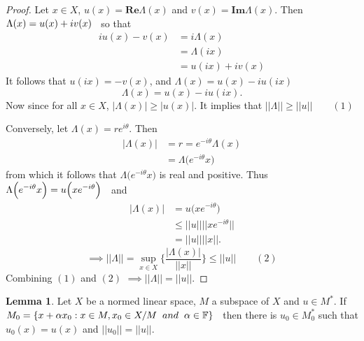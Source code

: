 \documentclass[11pt,a4paper]{article}
\theoremstyle{definition}
\newtheorem{lem}[thm]{Lemma}
\begin{document}
\begin{proof}
Let $x\in X$, $u(x)=\textbf{Re}\Lambda(x)$ and $v(x)=\textbf{Im}\Lambda(x)$. Then \hspace{0.2cm}$\Lambda(x)=u(x)+iv(x)\hspace{0.2cm}$ so that
\begin{align*}
iu(x)-v(x) &=i\Lambda(x)\\
           &=\Lambda(ix)\\
           &=u(ix)+iv(x)
\end{align*}
It follows that $u(ix)=-v(x)$, and $\Lambda(x)=u(x)-iu(ix)$ $$\Lambda(x)=u(x)-iu(ix).$$
Now since for all $x\in X$, $|\Lambda(x)|\geq |u(x)|$. It implies that $||\Lambda||\geq ||u||\qquad (1)$


Conversely, let $\Lambda(x)=re^{i\theta}$. Then
\begin{align*}
|\Lambda(x)| &= r=e^{-i\theta}\Lambda(x)\\
             &=\Lambda \Big(e^{-i\theta}x\Big)
\end{align*}
from which it follows that $\Lambda \Big(e^{-i\theta}x\Big)$ is real and positive. Thus \hspace{0.2cm}$\displaystyle{\Lambda \Big(e^{-i\theta}x\Big)=u\Big(xe^{-i\theta}\Big)}\hspace{0.2cm}$ and 
\begin{align*}
|\Lambda (x)| &=u\Big(xe^{-i\theta}\Big)\\
              &\leq ||u||||xe^{-i\theta}||\\
              &=||u||||x||.
\end{align*}
$$\implies ||\Lambda||=\sup_{x\in X}\Bigg\{\frac{|\Lambda(x)|}{||x||}\Bigg\}\leq ||u||\qquad (2)$$
Combining $(1)$ and $(2)$ $\implies ||\Lambda||=||u||$.


\pagebreak
\end{proof}


\begin{lem}
Let $X$ be a normed linear space, $M$ a subspace of $X$ and $u\in M^*$. If \hspace{0.2cm}\\$M_0=\{x+\alpha x_0:x\in M,x_0\in X/M\hspace{0.2cm} and\hspace{0.2cm} \alpha \in \mathbb{F}\}\hspace{0.2cm}$ then there is $u_0\in M^*_0$ such that $u_0(x)=u(x)$ and $||u_0||=||u||$.

\end{lem}
\end{document}
